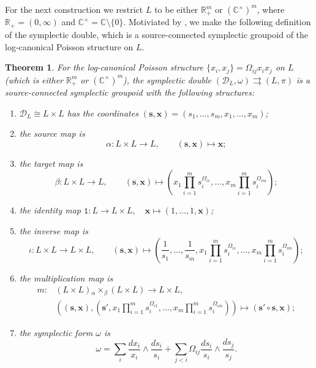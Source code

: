\documentclass{amsart}
\newtheorem{theorem}{Theorem}[section]
\numberwithin{equation}{section}
\newcommand{\bfs}{\mathbf{s}}
\newcommand{\bfx}{\mathbf{x}}
\renewcommand{\cD}{\mathcal{D}}
\newcommand{\CC}{\mathbb{C}}
\newcommand{\RR}{\mathbb{R}}
\newcommand{\rra}{\rightrightarrows}
\begin{document}
For the next construction we restrict $L$ to be either $\RR_+^m$ or $(\CC^\times)^m$, where $\RR_+ = (0, \infty)$ and $\CC^\times = \CC \setminus \{0\}$.
Motiviated by \cite{MR2470108}, we make the following definition of the symplectic double, which is a source-connected symplectic groupoid of the log-canonical Poisson structure on $L$.
\begin{theorem} \label{thm:SymDBLoc}
  \cite{MR2470108}
  For the log-canonical Poisson structure $\{x_i, x_j\} = \Omega_{ij} x_i x_j$ on $L$ (which is either $\RR_+^m$ or $(\CC^\times)^m$), the \emph{symplectic double} $(\cD_L, \omega) \rra (L, \pi)$ is a source-connected symplectic groupoid with the following structures:
  \begin{enumerate}
    \item $\cD_L \cong L \times L$ has the coordinates $(\bfs, \bfx) = (s_1, \ldots, s_m, x_1, \ldots, x_m)$;
    \item the source map is
      \[\alpha: L \times L \to L, \qquad (\bfs, \bfx) \mapsto \bfx;\]
    \item the target map is
      \[\beta: L \times L \to L, \qquad (\bfs, \bfx) \mapsto \left(x_1 \prod_{i=1}^m s_i^{\Omega_{i1}}, \ldots, x_m \prod_{i=1}^m s_i^{\Omega_{im}}\right);\]
	\item the identity map $\mathtt{1}: L \to L \times L, \quad \bfx \mapsto (1, \ldots, 1, \bfx)$;
    \item the inverse map is
      \[\iota: L \times L \to L \times L, \qquad (\bfs, \bfx) \mapsto \left(\frac{1}{s_1}, \ldots, \frac{1}{s_m}, x_1 \prod_{i=1}^m s_i^{\Omega_{i1}}, \ldots, x_m \prod_{i=1}^m s_i^{\Omega_{im}}\right);\]
    \item the multiplication map is
      \[\begin{aligned}
	  m: & \left(L \times L\right) {_\alpha \times_\beta} \left(L \times L\right) \to L \times L, \\
	     & \left((\bfs, \bfx), \left(\bfs', x_1 \prod_{i=1}^m s_i^{\Omega_{i1}}, \ldots, x_m \prod_{i=1}^m s_i^{\Omega_{im}}\right)\right) \mapsto (\bfs' \circ \bfs, \bfx );
        \end{aligned}\]
    \item the symplectic form $\omega$ is
      \begin{equation} 
        \label{eq:2-formG_X}
	\omega = \sum_{i} \frac{dx_i}{x_i} \wedge \frac{ds_i}{s_i} + \sum_{j < i} \Omega_{ij} \frac{ds_i}{s_i} \wedge \frac{ds_j}{s_j}.
      \end{equation}
  \end{enumerate}
\end{theorem}
\end{document}
